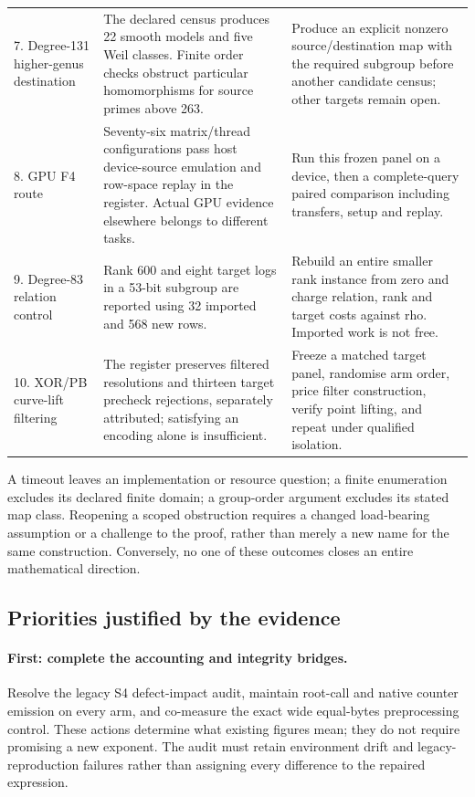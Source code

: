 \begin{longtable}{@{}p{3.1cm}p{5.5cm}p{4.8cm}@{}}
7. Degree-131 higher-genus destination & The declared census produces
22 smooth models and five Weil classes. Finite order checks obstruct
particular homomorphisms for source primes above 263. & Produce an
explicit nonzero source/destination map with the required subgroup before
another candidate census; other targets remain open. \\
8. GPU F4 route & Seventy-six matrix/thread configurations pass host
device-source emulation and row-space replay in the register. Actual
GPU evidence elsewhere belongs to different tasks. & Run this frozen
panel on a device, then a complete-query paired comparison including
transfers, setup and replay. \\
9. Degree-83 relation control & Rank 600 and eight target logs in a
53-bit subgroup are reported using 32 imported and 568 new rows. &
Rebuild an entire smaller rank instance from zero and charge relation,
rank and target costs against rho. Imported work is not free. \\
10. XOR/PB curve-lift filtering & The register preserves filtered
resolutions and thirteen target precheck rejections, separately
attributed; satisfying an encoding alone is insufficient. & Freeze a
matched target panel, randomise arm order, price filter construction,
verify point lifting, and repeat under qualified isolation. \\\bottomrule
\end{longtable}

A timeout leaves an implementation or resource question; a finite
enumeration excludes its declared finite domain; a group-order argument
excludes its stated map class. Reopening a scoped obstruction requires a
changed load-bearing assumption or a challenge to the proof, rather than
merely a new name for the same construction. Conversely, no one of
these outcomes closes an entire mathematical direction.

\subsection{Priorities justified by the evidence}

\paragraph{First: complete the accounting and integrity bridges.}
Resolve the legacy S4 defect-impact audit, maintain root-call and native
counter emission on every arm, and co-measure the exact wide
equal-bytes preprocessing control. These actions determine what existing
figures mean; they do not require promising a new exponent. The audit
must retain environment drift and legacy-reproduction failures rather
than assigning every difference to the repaired expression.

